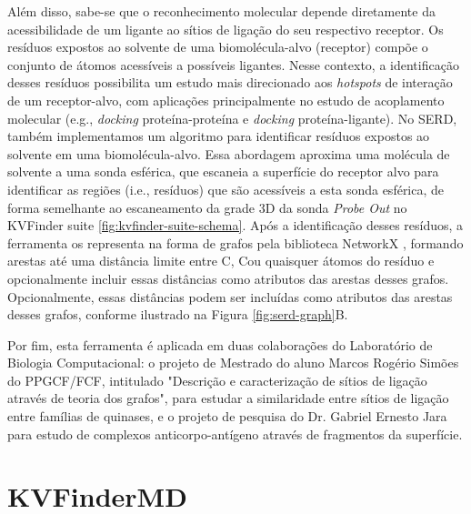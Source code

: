 \documentclass[Portugues]{phdquali}
\def\ie{i.e.\onedot}
\def\eg{e.g.\onedot}
\begin{document}
Além disso, sabe-se que o reconhecimento molecular depende diretamente da acessibilidade de um ligante ao sítios de ligação do seu respectivo receptor. Os resíduos expostos ao solvente de uma biomolécula-alvo (receptor) compõe o conjunto de átomos acessíveis a possíveis ligantes. Nesse contexto, a identificação desses resíduos possibilita um estudo mais direcionado aos \textit{hotspots} de interação de um receptor-alvo, com aplicações principalmente no estudo de acoplamento molecular (\eg, \textit{docking} proteína-proteína e \textit{docking} proteína-ligante). No SERD, também implementamos um algoritmo para identificar resíduos expostos ao solvente em uma biomolécula-alvo. Essa abordagem aproxima uma molécula de solvente a uma sonda esférica, que escaneia a superfície do receptor alvo para identificar as regiões (\ie, resíduos) que são acessíveis a esta sonda esférica, de forma semelhante ao escaneamento da grade 3D da sonda \textit{Probe Out} no KVFinder suite \ref{fig:kvfinder-suite-schema}. Após a identificação desses resíduos, a ferramenta os representa na forma de grafos pela biblioteca NetworkX \cite{networkx}, formando arestas até uma distância limite entre C\textalpha, C\textbeta\space ou quaisquer átomos do resíduo e opcionalmente incluir essas distâncias como atributos das arestas desses grafos. Opcionalmente, essas distâncias podem ser incluídas como atributos das arestas desses grafos, conforme ilustrado na Figura \ref{fig:serd-graph}B.

Por fim, esta ferramenta é aplicada em duas colaborações do Laboratório de Biologia Computacional: o projeto de Mestrado do aluno Marcos Rogério Simões do PPGCF/FCF, intitulado "Descrição e caracterização de sítios de ligação através de teoria dos grafos", para estudar a similaridade entre sítios de ligação entre famílias de quinases, e o projeto de pesquisa do Dr. Gabriel Ernesto Jara para estudo de complexos anticorpo-antígeno através de fragmentos da superfície.

\section{KVFinderMD}
\end{document}
